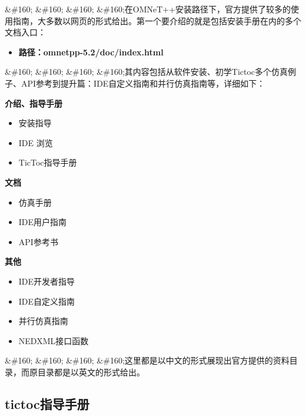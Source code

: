 \&\#160; \&\#160; \&\#160; \&\#160;在OMNeT++安装路径下，官方提供了较多的使用指南，大多数以网页的形式给出。第一个要介绍的就是包括安装手册在内的多个文档入口：

\begin{itemize}
\item \textbf{路径：omnetpp-5.2\slash doc\slash index.html}

\end{itemize}

\&\#160; \&\#160; \&\#160; \&\#160;其内容包括从软件安装、初学Tictoc多个仿真例子、API参考到提升篇：IDE自定义指南和并行仿真指南等，详细如下：

\textbf{介绍、指导手册}

\begin{itemize}
\item 安装指导

\item IDE 浏览

\item TicToc指导手册

\end{itemize}

\textbf{文档}

\begin{itemize}
\item 仿真手册

\item IDE用户指南

\item API参考书

\end{itemize}

\textbf{其他}

\begin{itemize}
\item IDE开发者指导

\item IDE自定义指南

\item 并行仿真指南

\item NEDXML接口函数

\end{itemize}

\&\#160; \&\#160; \&\#160; \&\#160;这里都是以中文的形式展现出官方提供的资料目录，而原目录都是以英文的形式给出。

\subsection{tictoc指导手册}
\label{tictoc指导手册}

